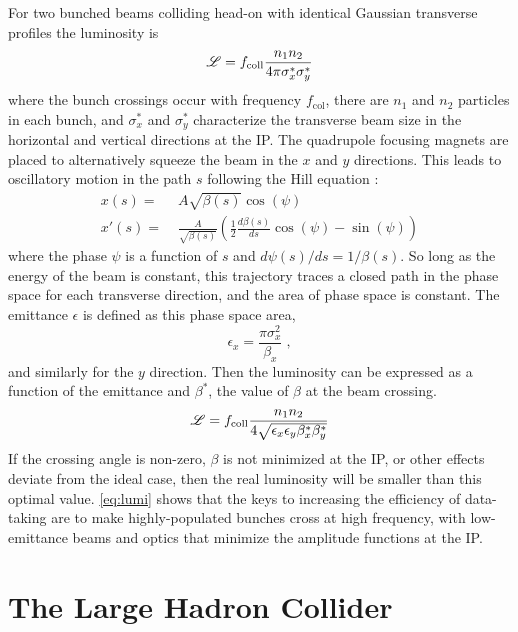 For two bunched beams colliding head-on with identical Gaussian transverse profiles the luminosity is
\begin{equation}
\mathscr{L} = f_\mathrm{coll} \frac{n_1 n_2}{4 \pi \sigma_x^* \sigma_y^*}
\end{equation}
where the bunch crossings occur with frequency $f_\mathrm{col}$, there are $n_1$ and $n_2$ particles in each bunch, and $\sigma_x^*$ and $\sigma_y^*$ characterize the transverse beam size in the horizontal and vertical directions at the \ac{IP}.
The quadrupole focusing magnets are placed to alternatively squeeze the beam in the $x$ and $y$ directions.
This leads to oscillatory motion in the path $s$ following the Hill equation \cite{Tanabashi:2018oca}:
\begin{align}
x(s) =& \; A \sqrt{\beta(s)} \cos (\psi) \\
x'(s) =& \; \frac{A}{\sqrt{\beta(s)}} \left( \frac{1}{2} \frac{d\beta(s)}{ds} \cos(\psi) - \sin(\psi) \right)
\end{align}
where the phase $\psi$ is a function of $s$ and $d\psi(s)/ds = 1/\beta(s)$.
So long as the energy of the beam is constant, this trajectory traces a closed path in the phase space for each transverse direction, and the area of phase space is constant.
The emittance $\epsilon$ is defined as this phase space area,
\begin{equation}
\epsilon_x = \frac{\pi \sigma_x^2}{\beta_x} \; ,
\end{equation}
and similarly for the $y$ direction.
Then the luminosity can be expressed as a function of the emittance and $\beta^*$, the value of $\beta$ at the beam crossing.
\begin{equation}
\label{eq:lumi}
\mathscr{L} = f_\mathrm{coll} \frac{n_1 n_2}{4 \sqrt{\epsilon_x \epsilon_y \beta_x^* \beta_y^*}}
\end{equation}
If the crossing angle is non-zero, $\beta$ is not minimized at the \ac{IP}, or other effects deviate from the ideal case, then the real luminosity will be smaller than this optimal value.
\cref{eq:lumi} shows that the keys to increasing the efficiency of data-taking are to make highly-populated bunches cross at high frequency, with low-emittance beams and optics that minimize the amplitude functions at the \ac{IP}.

\section{The Large Hadron Collider}

